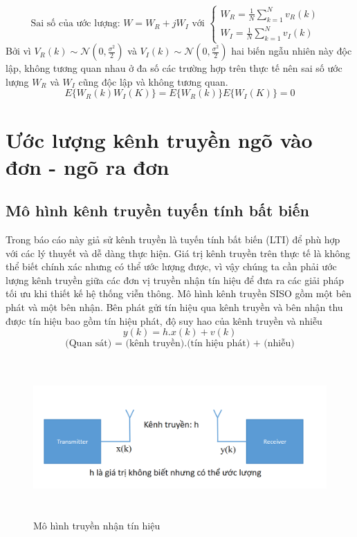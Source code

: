 \documentclass{article}
\begin{document}
$$ \text{Sai số của ước lượng: } W = W_R + jW_I \text{ với } \begin{cases}
    W_R = \frac{1}{N} \sum_{k=1}^{N} v_R(k) &\\
    W_I = \frac{1}{N} \sum_{k=1}^{N} v_I(k)
\end{cases}$$
Bởi vì $V_R(k) \sim \mathcal{N}(0,\frac{\sigma^2}{2})$ và $V_I(k) \sim \mathcal{N}(0,\frac{\sigma^2}{2})$ hai biến ngẫu nhiên này độc lập, không tương quan nhau ở đa số các trường hợp trên thực tế nên sai số ước lượng $W_R$ và $W_I$ cũng độc lập và không tương quan.
$$ E\{W_R(k)W_I(K)\} = E\{W_R(k)\}E\{W_I(K)\} = 0 $$
\section{Ước lượng kênh truyền ngõ vào đơn - ngõ ra đơn}
\subsection{Mô hình kênh truyền tuyến tính bất biến}

Trong báo cáo này giả sử kênh truyền là tuyến tính bất biến (LTI) để phù hợp với các lý thuyết và dễ dàng thực hiện. Giá trị kênh truyền trên thực tế là không thể biết chính xác nhưng có thể ước lượng được, vì vậy chúng ta cần phải ước lượng kênh truyền giữa các đơn vị truyền nhận tín hiệu để đưa ra các giải pháp tối ưu khi thiết kế hệ thống viễn thông. Mô hình kênh truyền SISO gồm một bên phát và một bên nhận. Bên phát gửi tín hiệu qua kênh truyền và bên nhận thu được tín hiệu bao gồm tín hiệu phát, độ suy hao của kênh truyền và nhiễu
$$y(k) = h.x(k) + v(k)$$
$$\text{(Quan sát) = (kênh truyền).(tín hiệu phát) + (nhiễu)}$$

\begin{figure}[h!]
    \centering
     \includegraphics[width=14cm, height =6cm]{photo/4.1.1.png}
    \caption{Mô hình truyền nhận tín hiệu}
    \label{Hình 14}
\end{figure}
\end{document}
